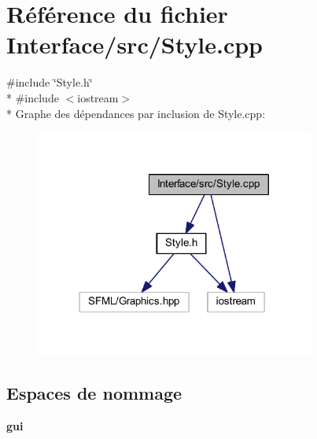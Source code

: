 \section{Référence du fichier Interface/src/\+Style.cpp}
\label{_style_8cpp}
{\ttfamily \#include \char`\"{}Style.\+h\char`\"{}}\\*
{\ttfamily \#include $<$iostream$>$}\\*
Graphe des dépendances par inclusion de Style.\+cpp\+:\nopagebreak
\begin{figure}[H]
\begin{center}
\leavevmode
\includegraphics[width=260pt]{_style_8cpp__incl}
\end{center}
\end{figure}
\subsection*{Espaces de nommage}
\begin{DoxyCompactItemize}
\item 
 {\bf gui}
\end{DoxyCompactItemize}
